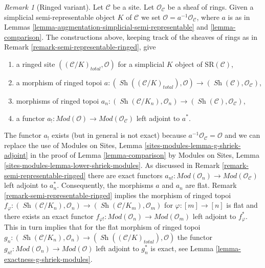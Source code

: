 \documentclass[10pt,a4paper]{amsart}
\theoremstyle{plain}
\theoremstyle{definition}
\theoremstyle{remark}
\newtheorem{remark}[subsection]{Remark}
\numberwithin{equation}{subsection}
\def\Sh{\mathop{\mathit{Sh}}\nolimits}
\begin{document}
\begin{remark}[Ringed variant]
\label{remark-augmentation-ringed}
Let $\mathcal{C}$ be a site. Let $\mathcal{O}_\mathcal{C}$ be a sheaf of rings.
Given a simplicial semi-representable object $K$ of $\mathcal{C}$
we set $\mathcal{O} = a^{-1}\mathcal{O}_\mathcal{C}$, where $a$
is as in Lemmas \ref{lemma-augmentation-simplicial-semi-representable} and
\ref{lemma-comparison}.
The constructions above, keeping track of the sheaves of rings
as in Remark \ref{remark-semi-representable-ringed}, give
\begin{enumerate}
\item a ringed site $((\mathcal{C}/K)_{total}, \mathcal{O})$
for a simplicial $K$ object of $\text{SR}(\mathcal{C})$,
\item a morphism of ringed topoi
$a : (\Sh((\mathcal{C}/K)_{total}), \mathcal{O}) \to
(\Sh(\mathcal{C}), \mathcal{O}_\mathcal{C})$,
\item morphisms of ringed topoi
$a_n : (\Sh(\mathcal{C}/K_n), \mathcal{O}_n) \to
(\Sh(\mathcal{C}), \mathcal{O}_\mathcal{C})$,
\item a functor
$a_! : \textit{Mod}(\mathcal{O}) \to \textit{Mod}(\mathcal{O}_\mathcal{C})$
left adjoint to $a^*$.
\end{enumerate}
The functor $a_!$ exists (but in general is not exact)
because $a^{-1}\mathcal{O}_\mathcal{C} = \mathcal{O}$
and we can replace the use of
Modules on Sites, Lemma \ref{sites-modules-lemma-g-shriek-adjoint}
in the proof of Lemma \ref{lemma-comparison}
by Modules on Sites, Lemma \ref{sites-modules-lemma-lower-shriek-modules}.
As discussed in Remark \ref{remark-semi-representable-ringed}
there are exact functors
$a_{n!} : \textit{Mod}(\mathcal{O}_n) \to
\textit{Mod}(\mathcal{O}_\mathcal{C})$
left adjoint to $a_n^*$. Consequently, the morphisms $a$ and $a_n$ are flat.
Remark \ref{remark-semi-representable-ringed}
implies the morphism of ringed topoi
$f_\varphi : (\Sh(\mathcal{C}/K_n), \mathcal{O}_n) \to
(\Sh(\mathcal{C}/K_m), \mathcal{O}_m)$
for $\varphi : [m] \to [n]$ is flat and there exists an exact functor
$f_{\varphi !} : \textit{Mod}(\mathcal{O}_n) \to \textit{Mod}(\mathcal{O}_m)$
left adjoint to $f_\varphi^*$. This in turn implies that for
the flat morphism of ringed topoi
$g_n : (\Sh(\mathcal{C}/K_n), \mathcal{O}_n) \to
(\Sh((\mathcal{C}/K)_{total}), \mathcal{O})$
the functor $g_{n!} : \textit{Mod}(\mathcal{O}_n) \to
\textit{Mod}(\mathcal{O})$ left adjoint to $g_n^*$ is exact, see
Lemma \ref{lemma-exactness-g-shriek-modules}.
\end{remark}
\end{document}
